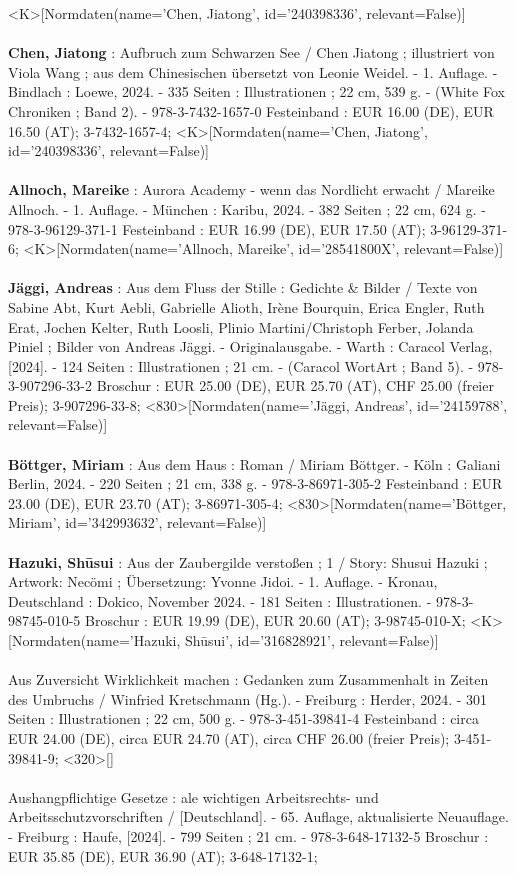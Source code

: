 \documentclass{article}
\begin{document}
\begin{multicols}{3}
<K>[Normdaten(name='Chen, Jiatong', id='240398336', relevant=False)]\\\\\textbf{Chen, Jiatong} : Aufbruch zum Schwarzen See / Chen Jiatong ; illustriert von Viola Wang ; aus dem Chinesischen übersetzt von Leonie Weidel. - 1. Auflage. - Bindlach : Loewe, 2024. - 335 Seiten : Illustrationen ; 22 cm, 539 g. - (White Fox Chroniken ; Band 2). - 978-3-7432-1657-0 Festeinband : EUR 16.00 (DE), EUR 16.50 (AT); 3-7432-1657-4; <K>[Normdaten(name='Chen, Jiatong', id='240398336', relevant=False)]\\\\\textbf{Allnoch, Mareike} : Aurora Academy - wenn das Nordlicht erwacht / Mareike Allnoch. - 1. Auflage. - München : Karibu, 2024. - 382 Seiten ; 22 cm, 624 g. - 978-3-96129-371-1 Festeinband : EUR 16.99 (DE), EUR 17.50 (AT); 3-96129-371-6; <K>[Normdaten(name='Allnoch, Mareike', id='28541800X', relevant=False)]\\\\\textbf{Jäggi, Andreas} : Aus dem Fluss der Stille : Gedichte \& Bilder / Texte von Sabine Abt, Kurt Aebli, Gabrielle Alioth, Irène Bourquin, Erica Engler, Ruth Erat, Jochen Kelter, Ruth Loosli, Plinio Martini/Christoph Ferber, Jolanda Piniel ; Bilder von Andreas Jäggi. - Originalausgabe. - Warth : Caracol Verlag, [2024]. - 124 Seiten : Illustrationen ; 21 cm. - (Caracol WortArt ; Band 5). - 978-3-907296-33-2 Broschur : EUR 25.00 (DE), EUR 25.70 (AT), CHF 25.00 (freier Preis); 3-907296-33-8; <830>[Normdaten(name='Jäggi, Andreas', id='24159788', relevant=False)]\\\\\textbf{Böttger, Miriam} : Aus dem Haus : Roman / Miriam Böttger. - Köln : Galiani Berlin, 2024. - 220 Seiten ; 21 cm, 338 g. - 978-3-86971-305-2 Festeinband : EUR 23.00 (DE), EUR 23.70 (AT); 3-86971-305-4; <830>[Normdaten(name='Böttger, Miriam', id='342993632', relevant=False)]\\\\\textbf{Hazuki, Shūsui} : Aus der Zaubergilde verstoßen ; 1 / Story: Shusui Hazuki ; Artwork: Necömi ; Übersetzung: Yvonne Jidoi. - 1. Auflage. - Kronau, Deutschland : Dokico, November 2024. - 181 Seiten : Illustrationen. - 978-3-98745-010-5 Broschur : EUR 19.99 (DE), EUR 20.60 (AT); 3-98745-010-X; <K>[Normdaten(name='Hazuki, Shūsui', id='316828921', relevant=False)]\\\\Aus Zuversicht Wirklichkeit machen : Gedanken zum Zusammenhalt in Zeiten des Umbruchs / Winfried Kretschmann (Hg.). - Freiburg : Herder, 2024. - 301 Seiten : Illustrationen ; 22 cm, 500 g. - 978-3-451-39841-4 Festeinband : circa EUR 24.00 (DE), circa EUR 24.70 (AT), circa CHF 26.00 (freier Preis); 3-451-39841-9; <320>[]\\\\Aushangpflichtige Gesetze : ale wichtigen Arbeitsrechts- und Arbeitsschutzvorschriften / [Deutschland]. - 65. Auflage, aktualisierte Neuauflage. - Freiburg : Haufe, [2024]. - 799 Seiten ; 21 cm. - 978-3-648-17132-5 Broschur : EUR 35.85 (DE), EUR 36.90 (AT); 3-648-17132-1; 
\end{multicols}
\end{document}
